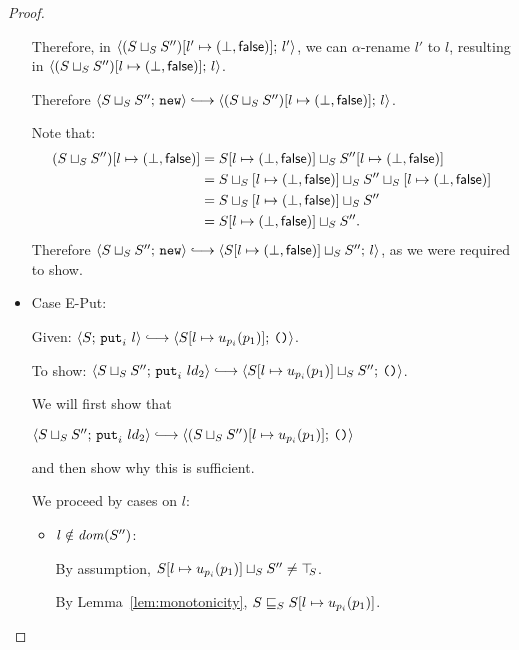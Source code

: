 \begin{proof}
\begin{itemize}
      Therefore, in
      $\langle (S \sqcup_{S} S'')[l' \mapsto (\bot, \textsf{false})];\, l' \rangle$,
      we can $\alpha$-rename $l'$ to $l$, resulting in
      $\langle (S \sqcup_{S} S'')[l \mapsto (\bot, \textsf{false})];\, l \rangle$.

      Therefore $\config{\lubstore{S}{S''}}{\NEW} \parstepsto
      \config{\extS{(\lubstore{S}{S''})}{l}{\bot}{\frozenfalse}}{l}$.

      Note that:
      \begin{align*}
        (S \sqcup_{S} S'')[l \mapsto (\bot, \textsf{false})] &=
        S[l \mapsto (\bot, \textsf{false})] \sqcup_{S} S''[l \mapsto (\bot, \textsf{false})] \\
        &= S \sqcup_{S} \left[ l \mapsto (\bot, \textsf{false}) \right] \sqcup_{S} S'' \sqcup_{S} \left[ l \mapsto (\bot, \textsf{false}) \right] \\
        &= S \sqcup_{S} \left[ l \mapsto (\bot, \textsf{false}) \right] \sqcup_{S} S'' \\
        &= S[l \mapsto (\bot, \textsf{false})] \sqcup_{S} S''.
      \end{align*}
      Therefore $\config{\lubstore{S}{S''}}{\NEW} \parstepsto
      \config{\lubstore{\extS{S}{l}{\bot}{\frozenfalse}}{S''}}{l}$, as we were
      required to show.

    \item Case {\sc E-Put}:

      Given: $\config{S}{\putiexp{l}} \parstepsto
      \config{\extSRaw{S}{l}{u_{p_i}(p_1)}}{\unit}$.

      To show: $\config{\lubstore{S}{S''}}{\putiexp{l}{d_2}}
      \parstepsto
      \config{\lubstore{\extSRaw{S}{l}{u_{p_i}(p_1)}}{S''}}{\unit}$.

      We will first show that

      $\config{\lubstore{S}{S''}}{\putiexp{l}{d_2}} \parstepsto
      \config{\extSRaw{(\lubstore{S}{S''})}{l}{u_{p_i}(p_1)}}{\unit}$

      and then show why this is sufficient.

      We proceed by cases on $l$:

      \begin{itemize}
        \item $l \notin \mathit{dom}(S'')$:

          By assumption, $S[l \mapsto u_{p_i}(p_1)] \sqcup_{S} S''
          \neq \top\hspace{-0.85mm}_{S}$.

          By Lemma~\ref{lem:monotonicity},
          $S \sqsubseteq_S S[l \mapsto u_{p_i}(p_1)]$.


\end{itemize}
\end{itemize}
\end{proof}
